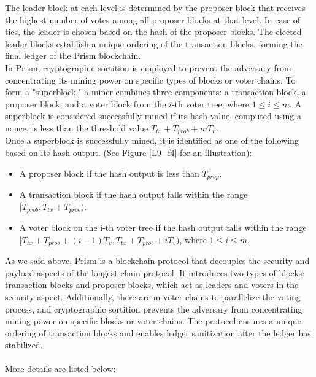 The leader block at each level is determined by the proposer block that receives the highest number of votes among all proposer blocks at that level. In case of ties, the leader is chosen based on the hash of the proposer blocks. The elected leader blocks establish a unique ordering of the transaction blocks, forming the final ledger of the Prism blockchain.\\
In Prism, cryptographic sortition is employed to prevent the adversary from concentrating its mining power on specific types of blocks or voter chains. To form a "superblock," a miner combines three components: a transaction block, a proposer block, and a voter block from the $i$-th voter tree, where $1 ≤ i ≤ m$. A superblock is considered successfully mined if its hash value, computed using a nonce, is less than the threshold value $T_{tx} + T_{prob} + mT_{v}$.\\
Once a superblock is successfully mined, it is identified as one of the following based on its hash output. (See Figure \ref{L9_f4} for an illustration):\\
\begin{itemize}
	\item A proposer block if the hash output is less than $T_{prop}$.
	\item A transaction block if the hash output falls within the range $[T_{prob}, T_{tx} + T_{prob})$.
	\item A voter block on the i-th voter tree if the hash output falls within the range $[T_{tx} + T_{prob} + (i − 1)T_{v}, T_{tx} + T_{prob} + iT_{v})$, where $1 ≤ i ≤ m$.
\end{itemize}
As we said above, Prism is a blockchain protocol that decouples the security and payload aspects of the longest chain protocol. It introduces two types of blocks: transaction blocks and proposer blocks, which act as leaders and voters in the security aspect. Additionally, there are m voter chains to parallelize the voting process, and cryptographic sortition prevents the adversary from concentrating mining power on specific blocks or voter chains. The protocol ensures a unique ordering of transaction blocks and enables ledger sanitization after the ledger has stabilized.\\
\\
More details are listed below:
\\
